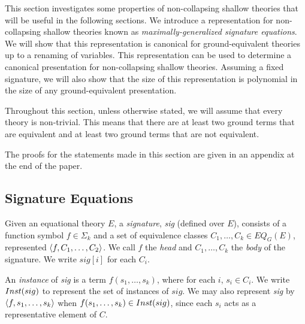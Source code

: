 This section investigates some properties of non-collapsing shallow theories that will be useful in the following sections.  
We introduce a representation for non-collapsing shallow theories known as \emph{maximally-generalized signature equations}.
We will show that this representation is canonical for ground-equivalent theories up to a renaming of variables.
This representation can be used to determine a canonical presentation for non-collapsing shallow theories. 
Assuming a fixed signature, we will also show that the size of this representation is polynomial in the size of any ground-equivalent presentation. 

Throughout this section, unless otherwise stated, we will assume that every theory is non-trivial. 
This means that there are at least two ground terms that are equivalent and at least two ground terms that are not equivalent. %

The proofs for the statements made in this section are given in an appendix at the end of the paper.  


\subsection{Signature Equations}
Given an equational theory $E$, a \emph{signature}, \emph{sig} (defined over $E$), consists of a function symbol $f \in \Sigma_k$ and a set of equivalence classes $C_1, \dots, C_k \in EQ_G(E)$, represented $\langle f,C_1,\dots,C_2 \rangle$. %
We call $f$ the \emph{head} and $C_1, \dots, C_k$ the \emph{body} of the signature.%
 We write $sig[i]$ for each $C_i$. %

An \emph{instance} of \emph{sig} is a term $f(s_1,\dots,s_k)$, where for each $i$,  $s_i \in C_i$.
We write $Inst(sig)$ to represent the set of instances of $sig$.
We may also represent \emph{sig} by $\langle f,s_1,\dots,s_k \rangle$ when $f(s_1,\dots,s_k) \in Inst(sig)$, since each $s_i$ acts as a representative element of $C$. 

